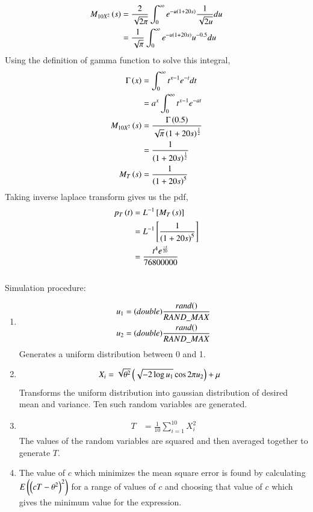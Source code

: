 \documentclass[journal,12pt,onecolumn]{IEEEtran}
\theoremstyle{remark}
\begin{document}
\begin{align}
	M_{10X^2}\left(s\right) &= \frac{2}{\sqrt{2\pi}}\int^{\infty}_{0}{e^{-u\left(1 + 20s\right)}\frac{1}{\sqrt{2u}}du}\\
	&= \frac{1}{\sqrt{\pi}}\int^{\infty}_{0}{e^{-u\left(1+20s\right)}u^{-0.5}du}
\end{align}
Using the definition of gamma function to solve this integral,
\begin{align}
	\Gamma\left(x\right) &= \int^{\infty}_0{t^{x-1}e^{-t}dt}\\
	&= a^x\int^{\infty}_0{t^{x-1}e^{-at}}\\
	M_{10X^2}\left(s\right) &= \frac{\Gamma\left(0.5\right)}{\sqrt{\pi}\left(1 + 20s\right)^{\frac{1}{2}}}\\
	&= \frac{1}{\left(1 + 20s\right)^{\frac{1}{2}}}\\
	M_T\left(s\right) &= \frac{1}{\left(1 + 20s\right)^5}
\end{align}
Taking inverse laplace transform gives us the pdf,
\begin{align}
	p_T\left(t\right) &= L^{-1}{}\left[M_T\left(s\right)\right]\\
	&= L^{-1}{}\left[\frac{1}{\left(1+20s\right)^5}\right]\\
	&= \frac{t^4e^{\frac{-t}{20}}}{76800000}
\end{align}
\\
Simulation procedure:
\begin{enumerate}[label = (\roman*)]
	\item \begin{align}
	u_1 &= (double) \frac{rand()}{RAND\_MAX} \vspace{2pt} \\
	u_2 &= (double) \frac{rand()}{RAND\_MAX}
	\end{align}
	Generates a uniform distribution between 0 and 1.
	\item \begin{align}
	 X_i &= \sqrt{\theta^2}\left(\sqrt{-2\log{u_1}} \cos{2\pi u_2}\right) + \mu
	 \end{align}
	 Transforms the uniform distribution into gaussian distribution of desired mean and variance. Ten such random variables are generated.
	\item \begin{align}
	T &= \frac{1}{10}\sum^{10}_{i=1}{X_i^2}
	\end{align} 
	The values of the random variables are squared and then averaged together to generate $T$.
	\item The value of $c$ which minimizes the mean square error is found by calculating $E\left(\left(cT - \theta^2\right)^2\right)$ for a range of values of $c$ and choosing that value of $c$ which gives the minimum value for the expression.
\end{enumerate}
\end{document}
